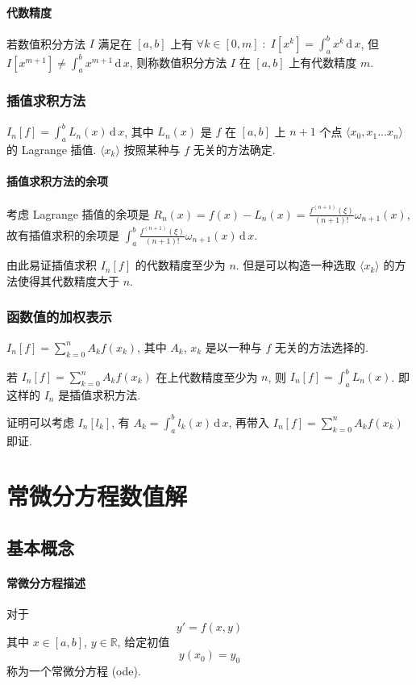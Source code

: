 \documentclass{ctexart}
\newcommand{\Rset}{\mathbb{R}}
\newcommand{\ud}{\,\mathrm{d}\,}
\begin{document}
\paragraph{代数精度}
    若数值积分方法 $I$ 满足在 $[a,b]$ 上有
    $\forall k \in [0, m]\;:\; I[x^k] = \int_a^b x^k \ud x$, 
    但 $I[x^{m+1}] \neq \int_a^b x^{m+1} \ud x$,
    则称数值积分方法 $I$ 在 $[a,b]$ 上有代数精度 $m$.
\subsubsection{插值求积方法}
    $I_n[f] = \int_a^b L_n(x) \ud x$,
    其中 $L_n(x)$ 是 $f$ 在 $[a,b]$ 上 $n+1$ 个点
    $\langle x_0, x_1 \ldots x_n \rangle$ 的 Lagrange 插值.
    $\langle x_k \rangle$ 按照某种与 $f$ 无关的方法确定.
\paragraph{插值求积方法的余项}
    考虑 Lagrange 插值的余项是 
    $R_n(x) = f(x) - L_n(x) =
        \frac{f^{(n+1)}(\xi)}{(n+1)!} \omega_{n+1}(x)$,
    故有插值求积的余项是 
    $\int_a^b \frac{f^{(n+1)}(\xi)}{(n+1)!} \omega_{n+1}(x) \ud x$.\par
    由此易证插值求积 $I_n[f]$ 的代数精度至少为 $n$.
    但是可以构造一种选取 $\langle x_k \rangle$
    的方法使得其代数精度大于 $n$.
\subsubsection{函数值的加权表示}
    $I_n[f] = \sum_{k = 0}^n A_k f(x_k)$,
    其中 $A_k$, $x_k$ 是以一种与 $f$ 无关的方法选择的.\par
    若 $I_n[f] = \sum_{k=0}^n A_k f(x_k)$ 在上代数精度至少为 $n$,
    则 $I_n[f] = \int_a^b L_n(x)$. 即这样的 $I_n$ 是插值求积方法.\par
    证明可以考虑 $I_n[l_k]$, 有 $A_k = \int_a^b l_k(x) \ud x$, 
    再带入 $I_n[f] = \sum_{k=0}^n A_k f(x_k)$ 即证.



\section{常微分方程数值解}
\subsection{基本概念}
\paragraph{常微分方程描述}
    对于 \[
        y' = f(x, y) \]
    其中 $x \in [a,b]$, $y \in \Rset$,
    给定初值 \[
        y(x_0) = y_0 \]
    称为一个常微分方程 (ode).
\end{document}
